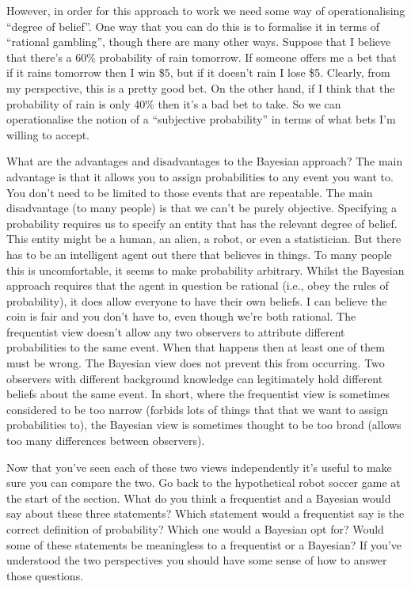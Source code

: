 However, in order for this approach to work we need some way of operationalising ``degree of belief''. One way that you can do this is to formalise it in terms of ``rational gambling'', though there are many other ways. Suppose that I believe that there's a 60\% probability of rain tomorrow. If someone offers me a bet that  if it rains tomorrow then I win \$5, but if it doesn't rain I lose \$5. Clearly, from my perspective, this is a pretty good bet. On the other hand, if I think that the probability of rain is only 40\% then it's a bad bet to take. So we can operationalise the notion of a ``subjective probability'' in terms of what bets I'm willing to accept. 

What are the advantages and disadvantages to the Bayesian approach? The main advantage is that it allows you to assign probabilities to any event you want to. You don't need to be limited to those events that are repeatable. The main disadvantage (to many people) is that we can't be purely objective. Specifying a probability requires us to specify an entity that has the relevant degree of belief. This entity might be a human, an alien, a robot, or even a statistician. But there has to be an intelligent agent out there that believes in things. To many people this is uncomfortable, it seems to make probability arbitrary. Whilst the Bayesian approach requires that the agent in question be rational (i.e., obey the rules of probability), it does allow everyone to have their own beliefs. I can believe the coin is fair and you don't have to, even though we're both rational. The frequentist view doesn't allow any two observers to attribute different probabilities to the same event. When that happens then at least one of them must be wrong. The Bayesian view does not prevent this from occurring. Two observers with different background knowledge can legitimately hold different beliefs about the same event. In short, where the frequentist view is sometimes considered to be too narrow (forbids lots of things that that we want to assign probabilities to), the Bayesian view is sometimes thought to be too broad (allows too many differences between observers). 


Now that you've seen each of these two views independently it's useful to make sure you can compare the two. Go back to the hypothetical robot soccer game at the start of the section. What do you think a frequentist and a Bayesian would say about these three statements? Which statement would a frequentist say is the correct definition of probability? Which one would a Bayesian opt for? Would some of these statements be meaningless to a frequentist or a Bayesian? If you've understood the two perspectives you should have some sense of how to answer those questions.

